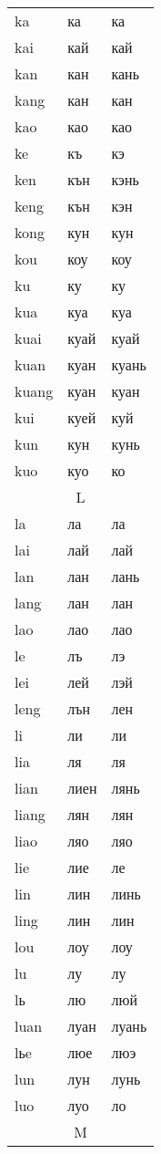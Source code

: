 \begin{longtable}{|l|l|l|}
ka &ка &ка
\\kai &кай &кай
\\kan &кан &кань
\\kang &кан &кан
\\kao &као &као
\\ke &къ &кэ
\\ken &кън &кэнь
\\keng &кън &кэн
\\kong &кун &кун
\\kou &коу &коу
\\ku &ку &ку
\\kua &куа &куа
\\kuai &куай &куай
\\kuan &куан &куань
\\kuang &куан &куан
\\kui &куей &куй
\\kun &кун &кунь
\\kuo &куо &ко
\\

\hline

\multicolumn{3}{|c|}{L} \\ \hline
la &ла &ла
\\lai &лай &лай
\\lan &лан &лань
\\lang &лан &лан
\\lao &лао &лао
\\le &лъ &лэ
\\lei &лей &лэй
\\leng &лън &лен
\\li &ли &ли
\\lia &ля &ля
\\lian &лиен &лянь
\\liang &лян &лян
\\liao &ляо &ляо
\\lie &лие &ле
\\lin &лин &линь
\\ling &лин &лин
\\lou &лоу &лоу
\\lu &лу &лу
\\lь &лю &люй
\\luan &луан &луань
\\lьe &люе &люэ
\\lun &лун &лунь
\\luo &луо &ло
\\

\hline

\multicolumn{3}{|c|}{M} \\ \hline


\end{longtable}
